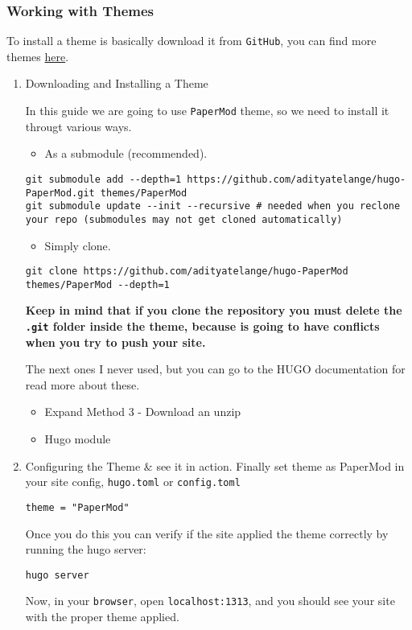 \documentclass[11pt]{article}
\begin{document}
\subsubsection{Working with Themes}
\label{sec:org1635a98}
To install a theme is basically download it from \texttt{GitHub}, you can find more themes \href{https://themes.gohugo.io/themes}{here}.
\begin{enumerate}
\item Downloading and Installing a Theme
\label{sec:orgc73df9b}

In this guide we are going to use \texttt{PaperMod} theme, so we need to install it througt various ways.
\begin{itemize}
\item As a submodule (recommended).
\end{itemize}

\begin{verbatim}
git submodule add --depth=1 https://github.com/adityatelange/hugo-PaperMod.git themes/PaperMod
git submodule update --init --recursive # needed when you reclone your repo (submodules may not get cloned automatically)
\end{verbatim}

\begin{itemize}
\item Simply clone.
\end{itemize}

\begin{verbatim}
git clone https://github.com/adityatelange/hugo-PaperMod themes/PaperMod --depth=1
\end{verbatim}

\textbf{Keep in mind that if you clone the repository you must delete the \texttt{.git} folder inside the theme, because is going to have conflicts when you try to push your site.}

The next ones I never used, but you can go to the HUGO documentation for read more about these.
\begin{itemize}
\item Expand Method 3 - Download an unzip
\item Hugo module
\end{itemize}
\item Configuring the Theme \& see it in action.
\label{sec:org5d9e60c}
Finally set theme as PaperMod in your site config, \texttt{hugo.toml} or \texttt{config.toml}

\begin{verbatim}
theme = "PaperMod"
\end{verbatim}

Once you do this you can verify if the site applied the theme correctly by running the hugo server:
\begin{verbatim}
hugo server
\end{verbatim}
Now, in your \texttt{browser}, open \texttt{localhost:1313}, and you should see your site with the proper theme applied.
\end{enumerate}
\end{document}

